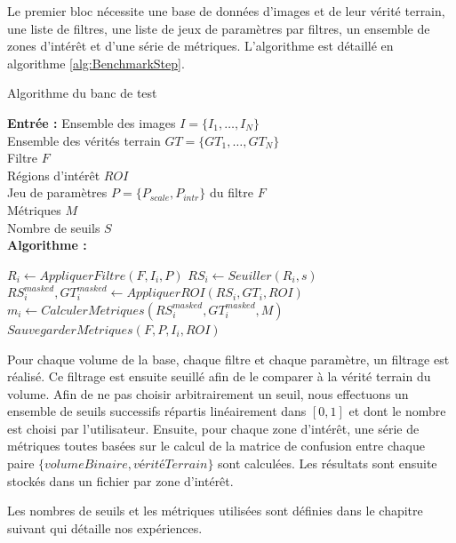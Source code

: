 Le premier bloc nécessite une base de données d'images et de leur vérité terrain, une liste de filtres, une liste de jeux de paramètres par filtres, un ensemble de zones d'intérêt et d'une série de métriques. L'algorithme est détaillé en algorithme \ref{alg:BenchmarkStep}.

\begin{algorithm}[!ht]
  \caption{Algorithme du banc de test}\label{alg:BenchmarkStep}
      \textbf{Entrée :}
      Ensemble des images $I=\{I_1,\ldots,I_N\}$ \\
      Ensemble des vérités terrain $GT=\{GT_1,\ldots,GT_N\}$\\
      Filtre $F$\\
      Régions d'intérêt $ROI$\\
      Jeu de paramètres  $P=\{ P_{scale},P_{intr} \} $ du filtre $F$\\ 
      Métriques $M$\\
      Nombre de seuils $S$ \\
      \textbf{Algorithme :}
      \begin{algorithmic}
              \State $R_{i} \gets AppliquerFiltre(F,I_i,P)$
                \State $RS_{i} \gets Seuiller(R_{i},s)$
                \State $RS_{i}^{masked},GT_{i}^{masked} \gets AppliquerROI( RS_{i},GT_{i}, ROI ) $
                \State $m_{i} \gets CalculerM\acute{e}triques(RS_{i}^{masked}, GT_{i}^{masked}, M)$
                \State $SauvegarderM\acute{e}triques(F,P,I_i,ROI)$
              \EndFor
          \EndFor
      \end{algorithmic}
  \end{algorithm}

Pour chaque volume de la base, chaque filtre et chaque paramètre, un filtrage est réalisé. Ce filtrage est ensuite seuillé afin de le comparer à la vérité terrain du volume. Afin de ne pas choisir arbitrairement un seuil, nous effectuons un ensemble de seuils successifs répartis linéairement dans $[0,1]$ et dont le nombre est choisi par l'utilisateur. Ensuite, pour chaque zone d'intérêt, une série de métriques toutes basées sur le calcul de la matrice de confusion entre chaque paire $\{volume Binaire, vérité Terrain\}$ sont calculées. Les résultats sont ensuite stockés dans un fichier par zone d'intérêt.

Les nombres de seuils et les métriques utilisées sont définies dans le chapitre suivant qui détaille nos expériences. 

